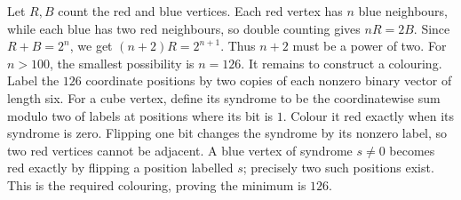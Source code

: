 Let $R,B$ count the red and blue vertices. Each red vertex has $n$ blue neighbours, while each blue has two red neighbours, so double counting gives $nR=2B$. Since $R+B=2^n$, we get $(n+2)R=2^{n+1}$. Thus $n+2$ must be a power of two. For $n>100$, the smallest possibility is $n=126$. It remains to construct a colouring. Label the $126$ coordinate positions by two copies of each nonzero binary vector of length six. For a cube vertex, define its syndrome to be the coordinatewise sum modulo two of labels at positions where its bit is $1$. Colour it red exactly when its syndrome is zero. Flipping one bit changes the syndrome by its nonzero label, so two red vertices cannot be adjacent. A blue vertex of syndrome $s\ne0$ becomes red exactly by flipping a position labelled $s$; precisely two such positions exist. This is the required colouring, proving the minimum is $\boxed{126}$.
